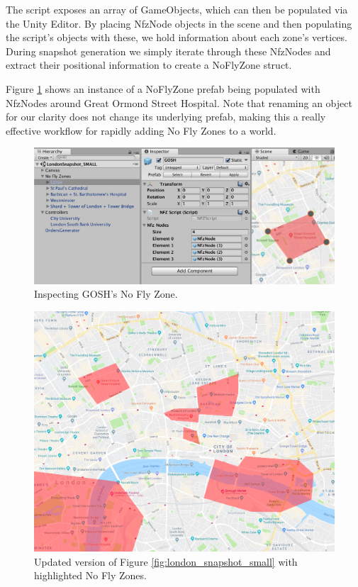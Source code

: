 \documentclass[a4paper,11pt,titlepage]{report}
\begin{document}
The script exposes an array of GameObjects, which can then be populated via the Unity Editor. By placing NfzNode objects in the scene and then populating the script's objects with these, we hold information about each zone's vertices. During snapshot generation we simply iterate through these NfzNodes and extract their positional information to create a NoFlyZone struct.

\clearpage
Figure \ref{fig:nfz_representation_example} shows an instance of a NoFlyZone prefab being populated with NfzNodes around Great Ormond Street Hospital. Note that renaming an object for our clarity does not change its underlying prefab, making this a really effective workflow for rapidly adding No Fly Zones to a world.

\begin{figure}[!hbpt]
  \center
  \includegraphics[width=0.85\linewidth]{img/nfz_representation_example.png}
  \caption{Inspecting GOSH's No Fly Zone.}
  \label{fig:nfz_representation_example}
\end{figure}

\begin{figure}[!hbpt]
  \center
  \includegraphics[width=0.85\linewidth]{img/london_snapshot_small_nfzs.png}
  \caption{Updated version of Figure \ref{fig:london_snapshot_small} with highlighted No Fly Zones.}
  \label{fig:london_snapshot_small_nfzs}
\end{figure}
\end{document}
